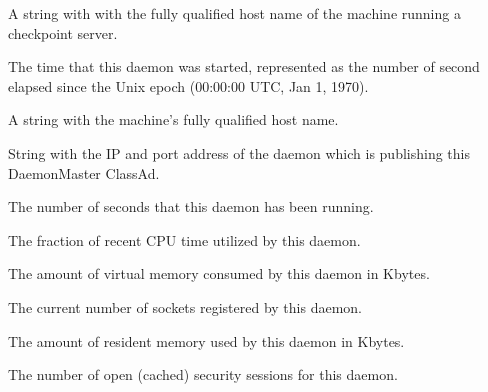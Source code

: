 \begin{description}

\item[\AdAttr{CkptServer}:] A string with with the fully qualified
  host name of the machine running a checkpoint server.

\item[\AdAttr{DaemonStartTime}:] The time that this daemon was
  started, represented as the number of second elapsed since
  the Unix epoch (00:00:00 UTC, Jan 1, 1970).

\item[\AdAttr{Machine}:] A string with the machine's fully qualified 
  host name.

\item[\AdAttr{MasterIpAddr}:] String with the IP and port address of the
 daemon which is publishing this DaemonMaster ClassAd.

\item[\AdAttr{MonitorSelfAge}:] The number of seconds that this daemon
  has been running.

\item[\AdAttr{MonitorSelfCPUUsage}:] The fraction of recent CPU time utilized
  by this daemon. 

\item[\AdAttr{MonitorSelfImageSize}:] The amount of virtual memory consumed by
  this daemon in Kbytes.

\item[\AdAttr{MonitorSelfRegisteredSocketCount}:] The current number of sockets
  registered by this daemon.

\item[\AdAttr{MonitorSelfResidentSetSize}:] The amount of resident memory
  used by this daemon in Kbytes.

\item[\AdAttr{MonitorSelfSecuritySessions}:] The number of open (cached)
  security sessions for this daemon.


\end{description}
